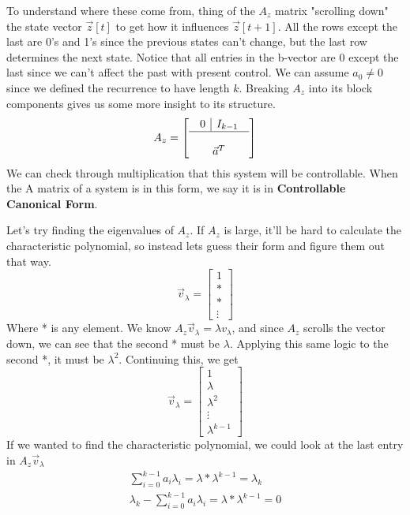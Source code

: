 \documentclass{article}
\begin{document}
To understand where these come from, thing of the $A_z$ matrix "scrolling down" the state vector $\vec{z}[t]$ to get how it influences $\vec{z}[t+1]$.
All the rows except the last are 0's and 1's since the previous states can't change, but the last row determines the next state.
Notice that all entries in the b-vector are 0 except the last since we can't affect the past with present control.
We can assume $a_0\ne 0$ since we defined the recurrence to have length $k$. Breaking $A_z$ into its block components gives us some more insight to its structure.
\[
    A_z = \left[
        \begin{array}{c}
            \begin{array}{c|c}
                0 & I_{k-1}\\
            \end{array} \\
            \hline \\
            \vec{a}^T
        \end{array}
    \right]
\]
We can check through multiplication that this system will be controllable.
When the A matrix of a system is in this form, we say it is in \textbf{Controllable Canonical Form}.

Let's try finding the eigenvalues of $A_z$. If $A_z$ is large, it'll be hard to calculate the characteristic polynomial, so instead lets guess their form and figure them out that way.
\[
    \vec{v}_\lambda = \left[
        \begin{array}{c}
            1\\
            *\\
            *\\
            \vdots
        \end{array}
    \right]
    \]
Where * is any element.
We know $A_z\vec{v}_\lambda=\lambda v_\lambda$, and since $A_z$ scrolls the vector down, we can see that the second * must be $\lambda$. Applying this same logic to the second *, it must be $\lambda^2$.
Continuing this, we get
\[
    \vec{v}_\lambda = \left[
        \begin{array}{c}
            1\\
            \lambda\\
            \lambda^2\\
            \vdots\\
            \lambda^{k-1}
        \end{array}
    \right]
    \]
If we wanted to find the characteristic polynomial, we could look at the last entry in $A_z\vec{v}_\lambda$
\[
    \begin{array}{c}
        \sum_{i=0}^{k-1}{a_i\lambda_i}=\lambda*\lambda^{k-1}=\lambda_k\\
        \lambda_k-\sum_{i=0}^{k-1}{a_i\lambda_i}=\lambda*\lambda^{k-1} = 0
    \end{array}
    \]
\end{document}
